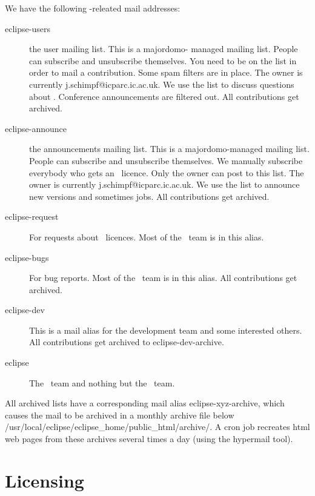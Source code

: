 We have the following \eclipse-releated mail addresses:
\begin{description}
\item[eclipse-users] the user mailing list. This is a majordomo-
        managed mailing list. People can subscribe and unsubscribe
        themselves. You need to be on the list in order to mail
        a contribution. Some spam filters are in place. The owner
        is currently j.schimpf@icparc.ic.ac.uk.
        We use the list to discuss questions about \eclipse.
        Conference announcements are filtered out.
        All contributions get archived.
\item[eclipse-announce] the announcements mailing list.
        This is a majordomo-managed mailing list. People can subscribe
        and unsubscribe themselves. We manually subscribe everybody who
        gets an \eclipse\ licence. Only the owner can post to this
        list. The owner is currently j.schimpf@icparc.ic.ac.uk.
        We use the list to announce new versions and sometimes jobs.
        All contributions get archived.
\item[eclipse-request] For requests about \eclipse\ licences.
        Most of the \eclipse\ team is in this alias.
\item[eclipse-bugs] For bug reports.
        Most of the \eclipse\ team is in this alias.
        All contributions get archived.
\item[eclipse-dev] This is a mail alias for the development team
        and some interested others. All contributions get archived
        to eclipse-dev-archive.
\item[eclipse] The \eclipse\ team and nothing but the \eclipse\ team.
\end{description}

All archived lists have a corresponding mail alias eclipse-xyz-archive,
which causes the mail to be archived in a monthly archive file below
/usr/local/eclipse/eclipse_home/public_html/archive/.
A cron job recreates html web pages from these archives several times
a day (using the hypermail tool).


\section{Licensing}

